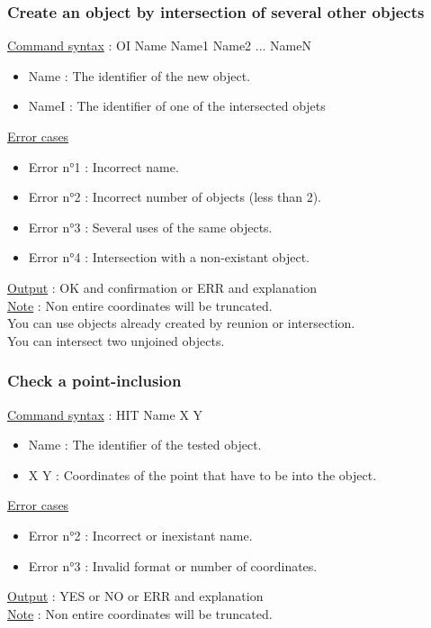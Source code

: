 \documentclass[a4paper, 12pts]{article}
\begin{document}
		\subsubsection{Create an object by intersection of several other objects}
			\uline{Command syntax} :
			OI Name Name1 Name2 ... NameN
			\begin{itemize}
				\item Name : The identifier of the new object.
				\item NameI : The identifier of one of the intersected objets
			\end{itemize}
			\uline{Error cases}
			\begin{itemize}
				\item Error n°1 : Incorrect name.
				\item Error n°2 : Incorrect number of objects (less than 2).
				\item Error n°3 : Several uses of the same objects.
				\item Error n°4 : Intersection with a non-existant object.
			\end{itemize}
			\uline{Output} : OK and confirmation or ERR and explanation\\
			\uline{Note} : 
			Non entire coordinates will be truncated.\\
			You can use objects already created by reunion or intersection.\\
			You can intersect two unjoined objects.

		\subsubsection{Check a point-inclusion}
			\uline{Command syntax} :
			HIT Name X Y
			\begin{itemize}
				\item Name : The identifier of the tested object.
				\item X Y : Coordinates of the point that have to be into the object.
			\end{itemize}
			\uline{Error cases}
			\begin{itemize}
				\item Error n°2 : Incorrect or inexistant name.
				\item Error n°3 : Invalid format or number of coordinates.
			\end{itemize}
			\uline{Output} : YES or NO or ERR and explanation\\
			\uline{Note} : 
			Non entire coordinates will be truncated.
\end{document}
